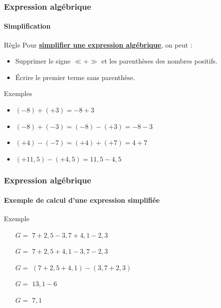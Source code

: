 \documentclass{beamer}
\begin{document}
\begin{frame}
	\frametitle{Expression algébrique}  
	\framesubtitle{Simplification }	
	
	\begin{block}{Règle}
		Pour \textbf{\underline{simplifier une expression algébrique}}, on peut :
		\begin{itemize}
			\item Supprimer le signe $\ll$+$\gg$ et les parenthèses des nombres positifs.
			\item \'Ecrire le premier terme sans parenthèse.
		\end{itemize}
	\end{block}
	
	\begin{exampleblock}{Exemples}
		
		\begin{itemize}
			\item $(-8) + (+3) = -8 + 3$
			\item $(-8) + (-3) = (-8) - (+3) = -8 -3 $
			\item $ (+4) - (-7) = (+4) + (+7) = 4 + 7$
			\item $ (+11,5) - (+4,5) = 11,5 - 4,5$ 
		\end{itemize}
	\end{exampleblock}
\end{frame}

\begin{frame}
	\frametitle{Expression algébrique}  
	\framesubtitle{Exemple de calcul d'une expression simplifiée}	
	
	
	\begin{exampleblock}{Exemple}
		\begin{itemize}
			\item[$G=$] $7 + 2,5 - 3,7 + 4,1 - 2,3$
			\item[$G=$] $7 + 2,5 + 4,1 - 3,7 - 2,3$
			\item[$G=$] $(7 + 2,5 + 4,1) - (3,7 + 2,3)$
			\item[$G=$] $13,1 - 6$
			\item[$G=$] $ 7,1 $
		\end{itemize}		
	\end{exampleblock}
	
\end{frame}
\end{document}
